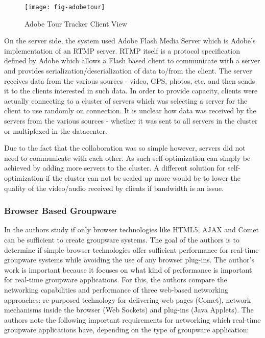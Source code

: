 {\begin{figure}
	\centering
	\texttt{[image: fig-adobetour]}
	\caption{Adobe Tour Tracker Client View}
	\label{fig:adobetour}
\end{figure}

On the server side, the system used Adobe Flash Media Server which is Adobe's implementation of an RTMP server. RTMP itself is a protocol specification defined by Adobe which allows a Flash based client to communicate with a server and provides serialization/deserialization of data to/from the client. The server receives data from the various sources - video, GPS, photos, etc. and then sends it to the clients interested in such data. In order to provide capacity, clients were actually connecting to a cluster of servers which was selecting a server for the client to use randomly on connection. It is unclear how data was received by the servers from the various sources - whether it was sent to all servers in the cluster or multiplexed in the datacenter.

Due to the fact that the collaboration was so simple however, servers did not need to communicate with each other. As such self-optimization can simply be achieved by adding more servers to the cluster. A different solution for self-optimization if the cluster can not be scaled up more would be to lower the quality of the video/audio received by clients if bandwidth is an issue.

\subsubsection{Browser Based Groupware}

In \cite{related:colab1} the authors study if only browser technologies like HTML5, AJAX and Comet can be sufficient to create groupware systems. The goal of the authors is to determine if simple browser technologies offer sufficient performance for real-time groupware systems while avoiding the use of any browser plug-ins. The author's work is important because it focuses on what kind of performance is important for real-time groupware applications. For this, the authors compare the networking capabilities and performance of three web-based networking approaches: re-purposed technology for delivering web pages (Comet), network mechanisms inside the browser (Web Sockets) and plug-ins (Java Applets). The authors note the following important requirements for networking which real-time groupware applications have, depending on the type of groupware application:

}
